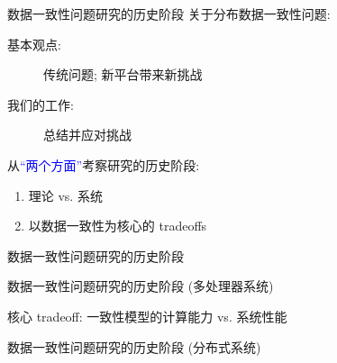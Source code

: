 \begin{frame}{数据一致性问题研究的历史阶段}
  关于分布数据一致性问题:
  \begin{description}
	\item[基本观点:] 传统问题; 新平台带来新挑战
	\item[我们的工作:] 总结并应对挑战
  \end{description}

  \pause
  \vspace{0.80cm}

  从\textcolor{blue}{``两个方面''}考察研究的历史阶段:
  \vspace{8pt}
  \begin{enumerate}
	\setlength{\itemsep}{6pt}
	\item 理论 vs. 系统
	\item 以数据一致性为核心的 tradeoffs
  \end{enumerate}
\end{frame}
\begin{frame}{数据一致性问题研究的历史阶段}
\end{frame}
\begin{frame}{数据一致性问题研究的历史阶段 (多处理器系统)}

  \begin{center}
	核心 tradeoff: 一致性模型的计算能力 vs. 系统性能
  \end{center}
\end{frame}
\begin{frame}{数据一致性问题研究的历史阶段 (分布式系统)}
  \graphicspath{{tikz-in-beamer/}}
  \begin{figure}[h!]
    \centering
    \begin{adjustbox}{max totalsize = {1.00\textwidth}{1.00\textheight}, center}
	  
    \end{adjustbox}
  \end{figure}
\end{frame}
